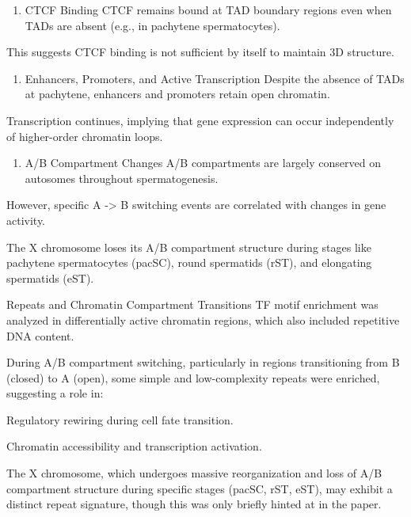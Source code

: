 \documentclass[
  a4paper,
  openany]{scrbook}
\providecommand{\tightlist}{%
  \setlength{\itemsep}{0pt}\setlength{\parskip}{0pt}}
\begin{document}
\begin{enumerate}
\def\labelenumi{\arabic{enumi}.}
\setcounter{enumi}{1}
\tightlist
\item
  CTCF Binding CTCF remains bound at TAD boundary regions even when TADs
  are absent (e.g., in pachytene spermatocytes).
\end{enumerate}

This suggests CTCF binding is not sufficient by itself to maintain 3D
structure.

\begin{enumerate}
\def\labelenumi{\arabic{enumi}.}
\setcounter{enumi}{2}
\tightlist
\item
  Enhancers, Promoters, and Active Transcription Despite the absence of
  TADs at pachytene, enhancers and promoters retain open chromatin.
\end{enumerate}

Transcription continues, implying that gene expression can occur
independently of higher-order chromatin loops.

\begin{enumerate}
\def\labelenumi{\arabic{enumi}.}
\setcounter{enumi}{3}
\tightlist
\item
  A/B Compartment Changes A/B compartments are largely conserved on
  autosomes throughout spermatogenesis.
\end{enumerate}

However, specific A -\textgreater{} B switching events are correlated
with changes in gene activity.

The X chromosome loses its A/B compartment structure during stages like
pachytene spermatocytes (pacSC), round spermatids (rST), and elongating
spermatids (eST).

Repeats and Chromatin Compartment Transitions TF motif enrichment was
analyzed in differentially active chromatin regions, which also included
repetitive DNA content.

During A/B compartment switching, particularly in regions transitioning
from B (closed) to A (open), some simple and low-complexity repeats were
enriched, suggesting a role in:

Regulatory rewiring during cell fate transition.

Chromatin accessibility and transcription activation.

The X chromosome, which undergoes massive reorganization and loss of A/B
compartment structure during specific stages (pacSC, rST, eST), may
exhibit a distinct repeat signature, though this was only briefly hinted
at in the paper.
\end{document}
